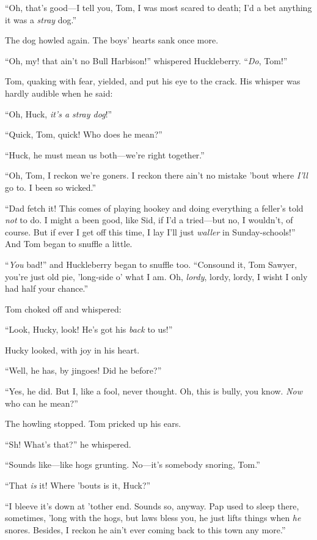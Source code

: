 \documentclass{book}
\begin{document}
“Oh, that’s good—I tell you, Tom, I was most scared to death; I’d a bet anything it was a \emph{stray} dog.”

The dog howled again. The boys’ hearts sank once more.

“Oh, my! that ain’t no Bull Harbison!” whispered Huckleberry. “\emph{Do}, Tom!”

Tom, quaking with fear, yielded, and put his eye to the crack. His whisper was hardly audible when he said:

“Oh, Huck, \emph{it’s a stray dog}!”

“Quick, Tom, quick! Who does he mean?”

“Huck, he must mean us both—we’re right together.”

“Oh, Tom, I reckon we’re goners. I reckon there ain’t no mistake ’bout where \emph{I’ll} go to. I been so wicked.”

“Dad fetch it! This comes of playing hookey and doing everything a feller’s told \emph{not} to do. I might a been good, like Sid, if I’d a tried—but no, I wouldn’t, of course. But if ever I get off this time, I lay I’ll just \emph{waller} in Sunday-schools!” And Tom began to snuffle a little.

“\emph{You} bad!” and Huckleberry began to snuffle too. “Consound it, Tom Sawyer, you’re just old pie, ’long-side o’ what I am. Oh, \emph{lordy}, lordy, lordy, I wisht I only had half your chance.”

Tom choked off and whispered:

“Look, Hucky, look! He’s got his \emph{back} to us!”

Hucky looked, with joy in his heart.

“Well, he has, by jingoes! Did he before?”

“Yes, he did. But I, like a fool, never thought. Oh, this is bully, you know. \emph{Now} who can he mean?”

The howling stopped. Tom pricked up his ears.

“Sh! What’s that?” he whispered.

“Sounds like—like hogs grunting. No—it’s somebody snoring, Tom.”

“That \emph{is} it! Where ’bouts is it, Huck?”

“I bleeve it’s down at ’tother end. Sounds so, anyway. Pap used to sleep there, sometimes, ’long with the hogs, but laws bless you, he just lifts things when \emph{he} snores. Besides, I reckon he ain’t ever coming back to this town any more.”
\end{document}
